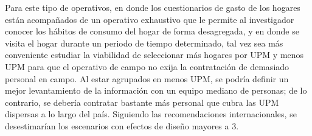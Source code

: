 \documentclass[
  12pt,
]{book}
\begin{document}
Para este tipo de operativos, en donde los cuestionarios de gasto de los hogares están acompañados de un operativo exhaustivo que le permite al investigador conocer los hábitos de consumo del hogar de forma desagregada, y en donde se visita el hogar durante un periodo de tiempo determinado, tal vez sea más conveniente estudiar la viabilidad de seleccionar más hogares por UPM y menos UPM para que el operativo de campo no exija la contratación de demasiado personal en campo. Al estar agrupados en menos UPM, se podría definir un mejor levantamiento de la información con un equipo mediano de personas; de lo contrario, se debería contratar bastante más personal que cubra las UPM dispersas a lo largo del país. Siguiendo las recomendaciones internacionales, se desestimarían los escenarios con efectos de diseño mayores a 3.
\end{document}
